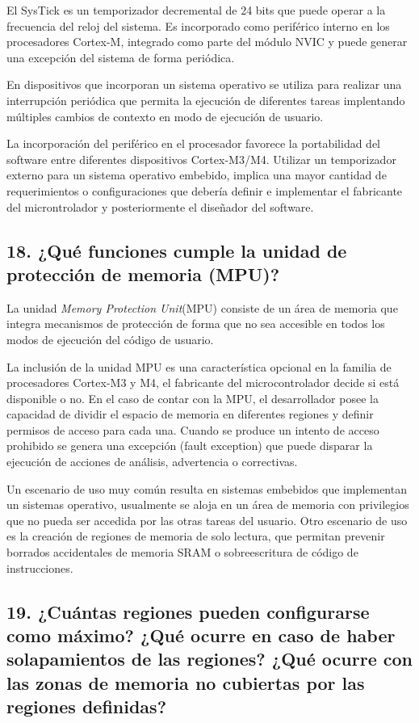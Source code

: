 \documentclass[10pt,a4paper,twoside,spanish]{article}	%
\begin{document}
El SysTick es un temporizador decremental de 24 bits que puede operar a la frecuencia del reloj del sistema. Es incorporado como periférico interno en los procesadores Cortex-M, integrado como parte del módulo NVIC y puede generar una excepción del sistema de forma periódica.

En dispositivos que incorporan un sistema operativo se utiliza para realizar una interrupción periódica que permita la ejecución de diferentes tareas implentando múltiples cambios de contexto en modo de ejecución de usuario. 

La incorporación del periférico en el procesador favorece la portabilidad del software entre diferentes dispositivos Cortex-M3/M4. Utilizar un temporizador externo para un sistema operativo embebido, implica una mayor cantidad de requerimientos o configuraciones que debería definir e implementar el fabricante del microntrolador y posteriormente el diseñador del software.  



\subsection*{18. ¿Qué funciones cumple la unidad de protección de memoria (MPU)?}

La unidad \textit{Memory Protection Unit}(MPU) consiste de un área de memoria que integra mecanismos de protección de forma que no sea accesible en todos los modos de ejecución del código de usuario. 

La inclusión de la unidad MPU es una característica opcional en la familia de procesadores Cortex-M3 y M4, el fabricante del microcontrolador decide si está disponible o no. En el caso de contar con la MPU, el desarrollador posee la capacidad de dividir el espacio de memoria en diferentes regiones y definir permisos de acceso para cada una. Cuando se produce un intento de acceso prohibido se genera una excepción (fault exception) que puede disparar la ejecución de acciones de análisis, advertencia o correctivas. 

Un escenario de uso muy común resulta en sistemas embebidos que implementan un sistemas operativo, usualmente se aloja en un área de memoria con privilegios que no pueda ser accedida por las otras tareas del usuario. Otro escenario de uso es la creación de regiones de memoria de solo lectura, que permitan prevenir borrados accidentales de memoria SRAM o sobreescritura de código de instrucciones.

\subsection*{19. ¿Cuántas regiones pueden configurarse como máximo? ¿Qué ocurre en caso de haber solapamientos de las regiones? ¿Qué ocurre con las zonas de memoria no cubiertas por las regiones definidas?}
\end{document}
